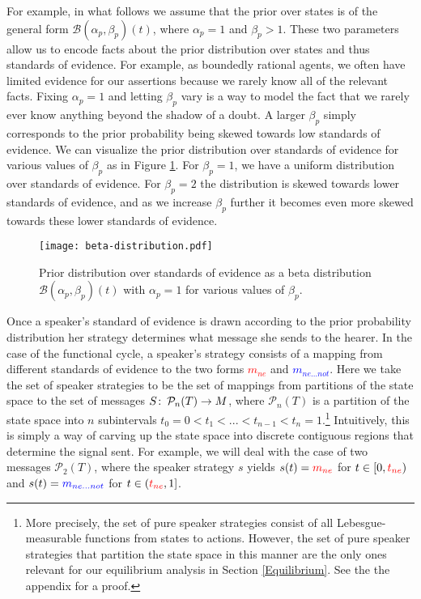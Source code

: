 \documentclass[linguex]{sp}
\theoremstyle{definition} \newtheorem{definition}{Definition}
\begin{document}
For example, in what follows we assume that the prior over states is of the general form $\mathcal{B}(\alpha_p,\beta_p)(t)$, where $\alpha_p = 1$ and $\beta_p > 1$. These two parameters allow us to encode facts about the prior distribution over states and thus standards of evidence. For example, as boundedly rational agents, we often have limited evidence for our assertions because we rarely know all of the relevant facts. Fixing $\alpha_p=1$ and letting $\beta_p$ vary is a way to model the fact that we rarely ever know anything beyond the shadow of a doubt.  A larger $\beta_p$ simply corresponds to the prior probability being skewed towards low standards of evidence.  We can visualize the prior distribution over standards of evidence for various values of $\beta_p$ as in Figure \ref{beta}. For $\beta_p = 1$, we have a uniform distribution over standards of evidence. For $\beta_p = 2$ the distribution is skewed towards lower standards of evidence, and as we increase $\beta_p$ further it becomes even more skewed towards these lower standards of evidence. 

\begin{figure}
\begin{center}
	\texttt{[image: beta-distribution.pdf]}
	\caption{Prior distribution over standards of evidence as a beta distribution $\mathcal{B}(\alpha_p, \beta_p)(t)$  with $\alpha_p = 1$ for various values of $\beta_p$.}
	\label{beta}
\end{center}
\end{figure}

Once a speaker's standard of evidence is drawn according to the prior probability distribution her strategy determines what message she sends to the hearer. In the case of the functional cycle, a speaker's strategy consists of a mapping from different standards of evidence to the two forms \emph{\textcolor{red}{$m_{ne}$}} and \emph{\textcolor{blue}{$m_{ne...not}$}}.  Here we take the set of speaker strategies to be the set of mappings from partitions of the state space to the set of messages $S \colon\thinspace \mathcal{P}_n(T) \rightarrow M$, where $\mathcal{P}_n(T)$ is a partition of the state space into $n$ subintervals $t_0 = 0 < t_1 < ... < t_{n-1} < t_n = 1$.\footnote{More precisely, the set of pure speaker strategies consist of all Lebesgue-measurable functions from states to actions. However, the set of pure speaker strategies that partition the state space in this manner are the only ones relevant for our equilibrium analysis in Section \ref{Equilibrium}. See the the appendix for a proof.}  Intuitively, this is simply a way of carving up the state space into discrete contiguous regions that determine the signal sent.  For example, we will deal with the case of two messages $\mathcal{P}_2(T)$, where the speaker  strategy $s$ yields $s(t) = \textcolor{red}{m_{ne}}$ for $t \in [0, \emph{\textcolor{red}{$t_{ne}$}})$ and $s(t) = \textcolor{blue}{m_{ne...not}}$  for $t \in (\emph{\textcolor{red}{$t_{ne}$}}, 1]$.  
\end{document}
